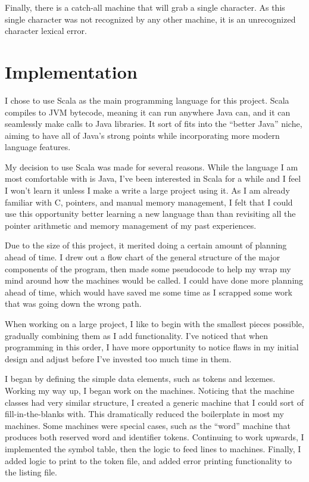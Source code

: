 \documentclass[paper=letter, fontsize=11pt, oneside, titlepage]{scrartcl}
\begin{document}
Finally, there is a catch-all machine that will grab a single character. As this single character was not recognized by any other machine, it is an unrecognized character lexical error.

\section{Implementation}\label{impl}

I chose to use Scala as the main programming language for this project.  Scala compiles to JVM bytecode, meaning it can run anywhere Java can, and it can seamlessly make calls to Java libraries.  It sort of fits into the ``better Java'' niche, aiming to have all of Java's strong points while incorporating more modern language features.

My decision to use Scala was made for several reasons.  While the language I am most comfortable with is Java, I've been interested in Scala for a while and I feel I won't learn it unless I make a write a large project using it.  As I am already familiar with C, pointers, and manual memory management, I felt that I could use this opportunity better learning a new language than than revisiting all the pointer arithmetic and memory management of my past experiences.  

Due to the size of this project, it merited doing a certain amount of planning ahead of time.  I drew out a flow chart of the general structure of the major components of the program, then made some pseudocode to help my wrap my mind around how the machines would be called.  I could have done more planning ahead of time, which would have saved me some time as I scrapped some work that was going down the wrong path.

When working on a large project, I like to begin with the smallest pieces possible, gradually combining them as I add functionality.  I've noticed that when programming in this order, I have more opportunity to notice flaws in my initial design and adjust before I've invested too much time in them.

I began by defining the simple data elements, such as tokens and lexemes. Working my way up, I began work on the machines.  Noticing that the machine classes had very similar structure, I created a generic machine that I could sort of fill-in-the-blanks with.  This dramatically reduced the boilerplate in most my machines. Some machines were special cases, such as the ``word'' machine that produces both reserved word and identifier tokens.  Continuing to work upwards, I implemented the symbol table, then the logic to feed lines to machines.  Finally, I added logic to print to the token file, and added error printing functionality to the listing file.
\end{document}
